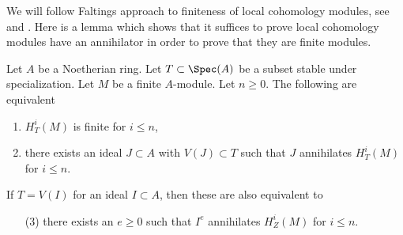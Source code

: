 \noindent
We will follow Faltings approach to finiteness of local cohomology
modules, see \cite{Faltings-annulators} and \cite{Faltings-finiteness}.
Here is a lemma which shows that it suffices to prove
local cohomology modules have an annihilator in order to prove that
they are finite modules.

\begin{lemma}
\label{lemma-check-finiteness-local-cohomology-by-annihilator}
\begin{reference}
\cite[Lemma 3]{Faltings-annulators}
\end{reference}
Let $A$ be a Noetherian ring. Let $T \subset \Spec(A)$ be a subset stable
under specialization. Let $M$ be a finite $A$-module. Let $n \geq 0$.
The following are equivalent
\begin{enumerate}
\item $H^i_T(M)$ is finite for $i \leq n$,
\item there exists an ideal $J \subset A$ with $V(J) \subset T$
such that $J$ annihilates $H^i_T(M)$ for $i \leq n$.
\end{enumerate}
If $T = V(I)$ for an ideal $I \subset A$, then these are also
equivalent to
\begin{enumerate}
\item[(3)] there exists an $e \geq 0$ such that $I^e$ annihilates
$H^i_Z(M)$ for $i \leq n$.
\end{enumerate}
\end{lemma}

